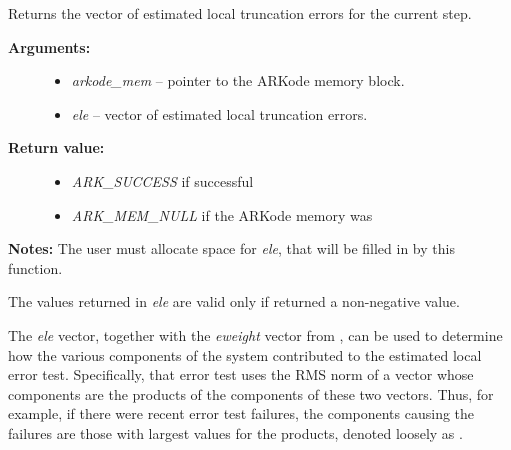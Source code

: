 \documentclass[letterpaper,10pt,english]{sphinxmanual}
\begin{document}
\begin{fulllineitems}
\label{c_interface/User_callable:c.ARKodeGetEstLocalErrors}
Returns the vector of estimated local truncation errors
for the current step.
\begin{description}
\item[{\textbf{Arguments:}}] \leavevmode\begin{itemize}
\item {} 
\emph{arkode\_mem} -- pointer to the ARKode memory block.

\item {} 
\emph{ele} -- vector of estimated local truncation errors.

\end{itemize}

\item[{\textbf{Return value:}}] \leavevmode\begin{itemize}
\item {} 
\emph{ARK\_SUCCESS} if successful

\item {} 
\emph{ARK\_MEM\_NULL} if the ARKode memory was 

\end{itemize}

\end{description}

\textbf{Notes:}  The user must allocate space for \emph{ele}, that will be
filled in by this function.

The values returned in \emph{ele} are valid only if {\hyperref[c_interface/User_callable:c.ARKode]{\emph{}}}
returned a non-negative value.

The \emph{ele} vector, together with the \emph{eweight} vector from
{\hyperref[c_interface/User_callable:c.ARKodeGetErrWeights]{\emph{}}}, can be used to determine how the
various components of the system contributed to the estimated local
error test.  Specifically, that error test uses the RMS norm of a
vector whose components are the products of the components of these
two vectors.  Thus, for example, if there were recent error test
failures, the components causing the failures are those with largest
values for the products, denoted loosely as .

\end{fulllineitems}
\end{document}
